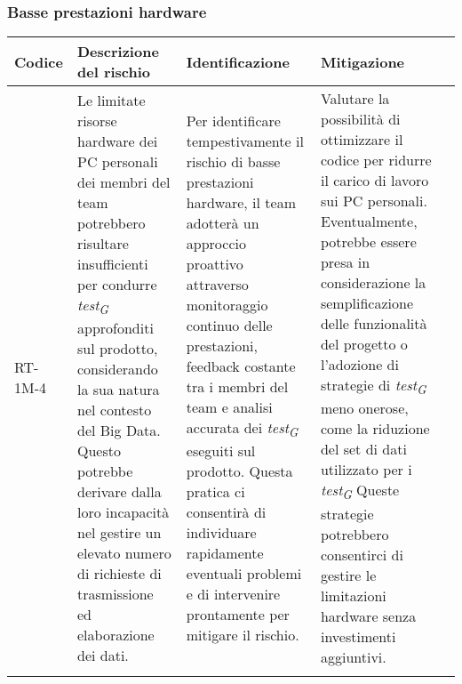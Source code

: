 \subsubsection{Basse prestazioni hardware} \label{sec:lowPrestazioniHW}
\begin{table}[H]
    \centering
    \begin{tabularx}{\textwidth}{l>{\RaggedRight}X>{\RaggedRight}X>{\RaggedRight}X>{\RaggedRight}X}
    \toprule
    \rowcolor{gray!50}
    \textbf{Codice} & \textbf{Descrizione del rischio} & \textbf{Identificazione} & \textbf{Mitigazione} \\
    \midrule
    \addlinespace 
    RT-1M-4 & 
    Le limitate risorse hardware dei PC personali dei membri del team potrebbero risultare insufficienti per condurre \textit{test}\textsubscript{\textit{G}} approfonditi sul prodotto, considerando la sua natura nel contesto del Big Data. Questo potrebbe derivare dalla loro incapacità nel gestire un elevato numero di richieste di trasmissione ed elaborazione dei dati. &
    Per identificare tempestivamente il rischio di basse prestazioni hardware, il team adotterà un approccio proattivo attraverso monitoraggio continuo delle prestazioni, feedback costante tra i membri del team e analisi accurata dei \textit{test}\textsubscript{\textit{G}} eseguiti sul prodotto. Questa pratica ci consentirà di individuare rapidamente eventuali problemi e di intervenire prontamente per mitigare il rischio. &
    Valutare la possibilità di ottimizzare il codice per ridurre il carico di lavoro sui PC personali. Eventualmente, potrebbe essere presa in considerazione la semplificazione delle funzionalità del progetto o l'adozione di strategie di \textit{test}\textsubscript{\textit{G}} meno onerose, come la riduzione del set di dati utilizzato per i \textit{test}\textsubscript{\textit{G}} Queste strategie potrebbero consentirci di gestire le limitazioni hardware senza investimenti aggiuntivi. \\
    \bottomrule
    \addlinespace 
    \end{tabularx}
\end{table}

